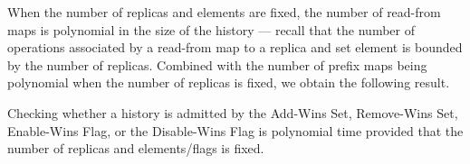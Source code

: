 When the number of replicas and elements are fixed, the number of read-from maps is polynomial in the size of the history — recall that the number of operations associated by a read-from map to a replica and set element is bounded by the number of replicas. Combined with the number of prefix maps being polynomial when the number of replicas is fixed, we obtain the following result.

\vspace{-.5mm}
\begin{theorem}
  \label{thm:ptime:sets}

  Checking whether a history is admitted by the Add-Wins Set, Remove-Wins Set, Enable-Wins Flag, or the Disable-Wins Flag is polynomial time provided that the number of replicas and elements/flags is fixed.

\vspace{-1.5mm}
\end{theorem}
